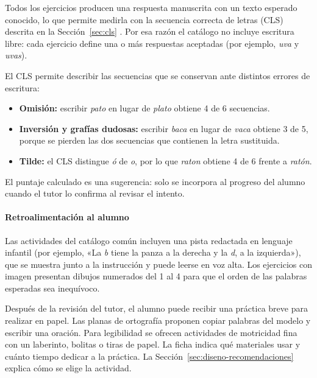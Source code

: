 Todos los ejercicios producen una respuesta manuscrita con un texto esperado
conocido, lo que permite medirla con la secuencia correcta de letras
(CLS) descrita en la Sección~\ref{sec:cls} \cite{treiman2016measures, aimswebplus2025manual}.
Por esa razón el catálogo no incluye escritura libre: cada ejercicio define una
o más respuestas aceptadas (por ejemplo, \textit{uva} y \textit{uvas}).

El CLS permite describir las secuencias que se conservan ante distintos
errores de escritura:

\begin{itemize}
    \item \textbf{Omisión:} escribir \textit{pato} en lugar de \textit{plato}
    obtiene 4 de 6 secuencias.
    \item \textbf{Inversión y grafías dudosas:} escribir \textit{baca} en
    lugar de \textit{vaca} obtiene 3 de 5, porque se pierden las dos
    secuencias que contienen la letra sustituida.
    \item \textbf{Tilde:} el CLS distingue \textit{ó} de \textit{o}, por lo que
    \textit{raton} obtiene 4 de 6 frente a \textit{ratón}.
\end{itemize}

El puntaje calculado es una sugerencia: solo se incorpora al progreso del
alumno cuando el tutor lo confirma al revisar el intento.

\paragraph{Retroalimentación al alumno}

Las actividades del catálogo común incluyen una pista redactada en lenguaje infantil (por
ejemplo, «La \textit{b} tiene la panza a la derecha y la \textit{d}, a la
izquierda»), que se muestra junto a la instrucción y puede leerse en voz alta. Los
ejercicios con imagen presentan dibujos numerados del 1 al 4 para que el orden
de las palabras esperadas sea inequívoco.

Después de la revisión del tutor, el alumno puede recibir una práctica breve
para realizar en papel. Las planas de ortografía proponen copiar palabras
del modelo y escribir una oración. Para legibilidad se ofrecen actividades
de motricidad fina con un laberinto, bolitas o tiras de papel. La ficha
indica qué materiales usar y cuánto tiempo dedicar a la práctica.
La Sección~\ref{sec:diseno-recomendaciones} explica cómo se elige la actividad.

